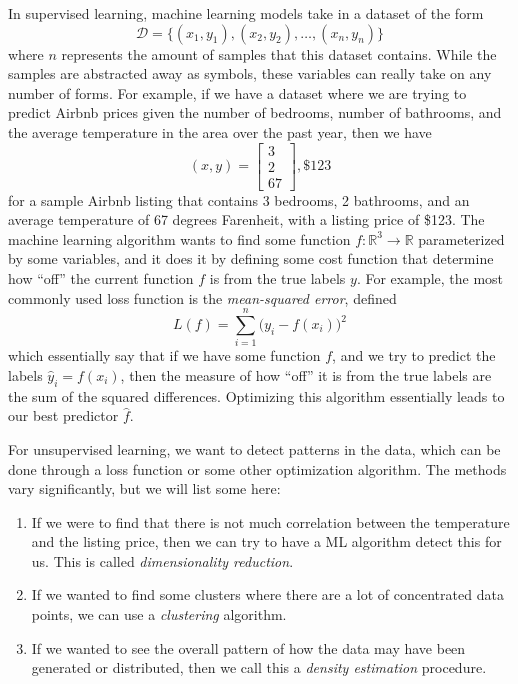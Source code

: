 \documentclass[10pt]{article}
\begin{document}
    In supervised learning, machine learning models take in a dataset of the form 
    \begin{equation}
      \mathcal{D} = \{(x_1, y_1), (x_2, y_2), \ldots, (x_n, y_n) \}
    \end{equation}
    where $n$ represents the amount of samples that this dataset contains. While the samples are abstracted away as symbols, these variables can really take on any number of forms. For example, if we have a dataset where we are trying to predict Airbnb prices given the number of bedrooms, number of bathrooms, and the average temperature in the area over the past year, then we have 
    \begin{equation}
      (x, y) = \begin{bmatrix} 3 \\ 2 \\ 67 \end{bmatrix}, \$123
    \end{equation}
    for a sample Airbnb listing that contains 3 bedrooms, 2 bathrooms, and an average temperature of 67 degrees Farenheit, with a listing price of \$123. The machine learning algorithm wants to find some function $f: \mathbb{R}^3 \rightarrow \mathbb{R}$ parameterized by some variables, and it does it by defining some cost function that determine how ``off'' the current function $f$ is from the true labels $y$. For example, the most commonly used loss function is the \textit{mean-squared error}, defined 
    \begin{equation}
      L(f) = \sum_{i=1}^n \big( y_i - f(x_i)\big)^2
    \end{equation}
    which essentially say that if we have some function $f$, and we try to predict the labels $\hat{y}_i = f(x_i)$, then the measure of how ``off'' it is from the true labels are the sum of the squared differences. Optimizing this algorithm essentially leads to our best predictor $\hat{f}$. 

    For unsupervised learning, we want to detect patterns in the data, which can be done through a loss function or some other optimization algorithm. The methods vary significantly, but we will list some here: 
    \begin{enumerate}
      \item If we were to find that there is not much correlation between the temperature and the listing price, then we can try to have a ML algorithm detect this for us. This is called \textit{dimensionality reduction}. 
      \item If we wanted to find some clusters where there are a lot of concentrated data points, we can use a \textit{clustering} algorithm. 
      \item If we wanted to see the overall pattern of how the data may have been generated or distributed, then we call this a \textit{density estimation} procedure. 
    \end{enumerate}
\end{document}
